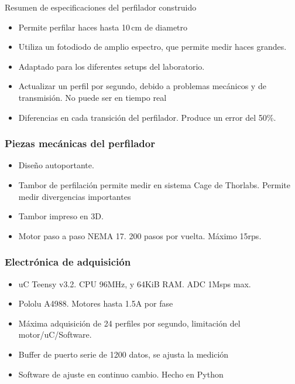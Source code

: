 \documentclass{article}
\begin{document}
        Resumen de especificaciones del perfilador construido
        \begin{itemize}
            \item Permite perfilar haces hasta 10$\,$cm de diametro 
            \item Utiliza un fotodiodo de amplio espectro, que permite medir haces grandes.
            \item Adaptado para los diferentes setups del laboratorio.
            \item Actualizar un perfil por segundo, debido a problemas mecánicos y de transmisión. No puede ser en tiempo real
            \item Diferencias en cada transición del perfilador. Produce un error del 50\%.
        \end{itemize}

    \subsubsection{Piezas mecánicas del perfilador}

                \begin{itemize}
                \item Diseño autoportante.
                \item Tambor de perfilación permite medir en sistema Cage de Thorlabs. Permite medir divergencias importantes
                \item Tambor impreso en 3D.
                \item Motor paso a paso NEMA 17. 200 pasos por vuelta. Máximo 15rps. 
                \end{itemize}

 

    \subsubsection{Electrónica de adquisición}


                \begin{itemize}
                    \item uC Teensy v3.2. CPU 96MHz, y 64KiB RAM. ADC 1Msps max.
                    \item Pololu A4988. Motores hasta 1.5A por fase
                    \item Máxima adquisición de 24 perfiles por segundo, limitación del motor/uC/Software. 
                    \item Buffer de puerto serie de 1200 datos, se ajusta la medición
                    \item Software de ajuste en continuo cambio. Hecho en Python
                \end{itemize}
\end{document}

